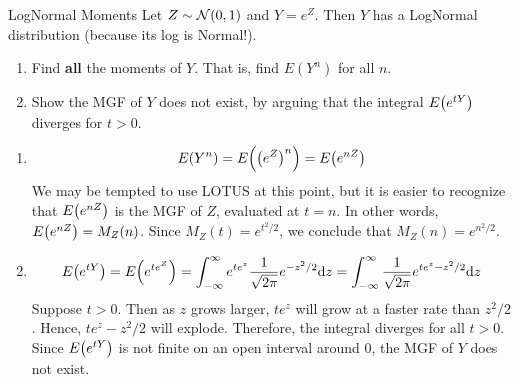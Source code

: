 \documentclass[11.5pt]{article}
\begin{document}
\begin{exercise}{LogNormal Moments} 
Let $Z \sim \mathcal{N}(0, 1)$ and $Y = e^Z$. Then $Y$ has a LogNormal distribution (because its log is Normal!).
\begin{enumerate}
\item Find \textbf{all} the moments of $Y$. That is, find $E(Y^n)$ for all $n$. 
\item Show the MGF of $Y$ does not exist, by arguing that the integral $E\paren{e^{tY}}$ diverges for $t > 0$.
\end{enumerate}
\end{exercise}

\begin{solution}{4}
\vspace{-5mm}
\begin{enumerate}
\item 
$$E\paren{Y^n} = E\paren{\paren{e^Z}^n} = E\paren{e^{nZ}}$$
We may be tempted to use LOTUS at this point, but it is easier to recognize that $E\paren{e^{nZ}}$ is the MGF of $Z$, evaluated at $t = n$. In other words, $E\paren{e^{nZ}} = M_Z(n)$. Since $M_Z(t) = e^{t^2/2}$, we conclude that $M_Z(n) = e^{n^2/2}$.
\item
$$E\paren{e^{tY}} = E\paren{e^{te^Z}} = \int_{-\infty}^\infty e^{te^z} \frac{1}{\sqrt{2 \pi}} e^{-z^2/2} \textrm{d} z = \int_{-\infty}^\infty \frac{1}{\sqrt{2 \pi}} e^{te^z -z^2/2} \textrm{d} z$$
Suppose $t > 0$. Then as $z$ grows larger, $te^z$ will grow at a faster rate than $z^2 / 2$. Hence, $te^z - z^2 / 2$ will explode. Therefore, the integral diverges for all $t > 0$. Since $E\paren{e^{tY}}$ is not finite on an open interval around 0, the MGF of $Y$ does not exist.
\end{enumerate}
\end{solution} 
\end{document}
